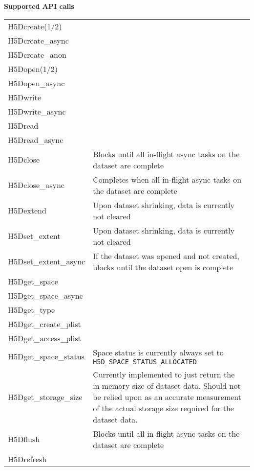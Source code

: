 \documentclass[../users_guide.tex]{subfiles}
\begin{document}
\begin{center}

\textbf{Supported API calls}
\vspace{.2in} \\

\begin{tabularx}{\linewidth}{| X | >{\RaggedRight}X |}
\hline
\rowcolor{lightgray!50}%
\multicolumn{1}{| c |}{\textbf{API call}} & \multicolumn{1}{c |}{\textbf{Notes}} \\ \hline

H5Dcreate(1/2) & \\ \hline
H5Dcreate\_async & \\ \hline
H5Dcreate\_anon & \\ \hline
H5Dopen(1/2) & \\ \hline
H5Dopen\_async & \\ \hline
H5Dwrite & \\ \hline
H5Dwrite\_async & \\ \hline
H5Dread & \\ \hline
H5Dread\_async & \\ \hline
H5Dclose & Blocks until all in-flight async tasks on the dataset are complete\\ \hline
H5Dclose\_async & Completes when all in-flight async tasks on the dataset are complete\\ \hline
H5Dextend & Upon dataset shrinking, data is currently not cleared\footnotemark[1]\\ \hline
H5Dset\_extent & Upon dataset shrinking, data is currently not cleared\footnotemark[1]\\ \hline
H5Dset\_extent\_async & If the dataset was opened and not created, blocks until the dataset open is complete\\ \hline
H5Dget\_space & \\ \hline
H5Dget\_space\_async & \\ \hline
H5Dget\_type & \\ \hline
H5Dget\_create\_plist & \\ \hline
H5Dget\_access\_plist & \\ \hline
H5Dget\_space\_status & Space status is currently always set to \texttt{H5D\_SPACE\_STATUS\_ALLOCATED}\\ \hline
H5Dget\_storage\_size & Currently implemented to just return the in-memory size of dataset data. Should not be relied upon as an accurate measurement of the actual storage size required for the dataset data.\\ \hline
H5Dflush & Blocks until all in-flight async tasks on the dataset are complete\\ \hline
H5Drefresh & \\ \hline


\end{tabularx}
\end{center}
\end{document}
